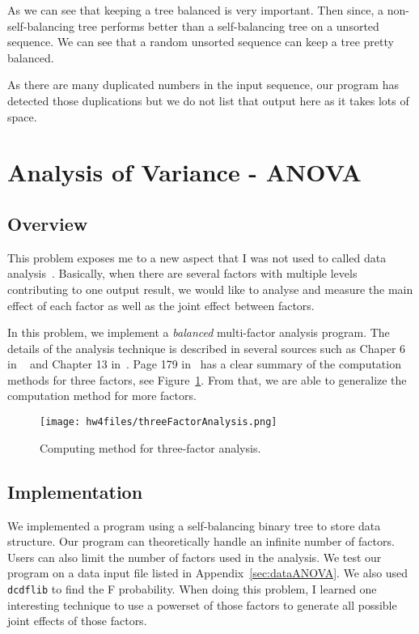\documentclass{article}
\begin{document}
As we can see that keeping a tree balanced is very important. Then since, a
non-self-balancing tree performs better than a self-balancing tree  on a
unsorted sequence. We can see that a random unsorted sequence can keep a
tree pretty balanced.

As there are many duplicated numbers in the input sequence, our program has
detected those duplications but we do not list that output here as it takes
lots of space.

\section{Analysis of Variance - ANOVA}
\subsection{Overview}
This problem exposes me to a new aspect that I was not used to called data
analysis~\cite{MasonDataAnalysis, KeppelDataAnalysis}. Basically, when there are
several factors with multiple levels contributing to one output result, we
would like to analyse and measure the main effect of each factor as well as the
joint effect between factors.

In this problem, we implement a \textit{balanced} multi-factor analysis program.
The details of the analysis technique is described in several sources such
as Chaper 6 in ~\cite{MasonDataAnalysis} and Chapter
13 in~\cite{KeppelDataAnalysis}. Page 179 in~\cite{MasonDataAnalysis} has a
clear summary of the computation methods for three factors, see
Figure~\ref{fig:threeFactors}. From that, we are able to generalize the
computation method for more factors.

 \begin{figure}[ht!]
\centering
\texttt{[image: hw4files/threeFactorAnalysis.png]}
\caption{Computing method for three-factor analysis.}
\label{fig:threeFactors}
\end{figure}

\subsection{Implementation}
We implemented a program using a self-balancing binary tree to store data
structure. Our program can theoretically handle an infinite number of factors.
Users can also limit the number of factors used in the analysis. We test our
program on a data input file listed in Appendix~\ref{sec:dataANOVA}. We also
used \texttt{dcdflib} to find the F probability. When doing this problem, I
learned one interesting technique to use a powerset of those factors to generate
all possible joint effects of those factors.
\end{document}
